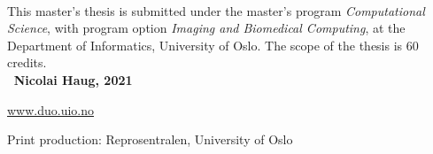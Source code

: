 \textit{} 
\\ [100 pt]
This master's thesis is submitted under the master's program \textit{Computational Science}, with program option \textit{Imaging and Biomedical Computing}, at the Department of Informatics, University of Oslo. The scope of the thesis is 60 credits.
\\ [350 pt]
\textbf{\faCopyright \, Nicolai Haug, 2021}

\href{https://www.duo.uio.no/}{www.duo.uio.no}

Print production: Reprosentralen, University of Oslo